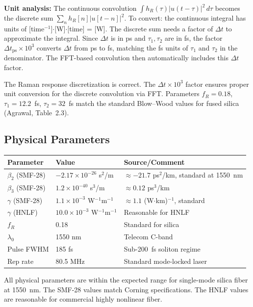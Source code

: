 \documentclass[12pt,a4paper]{article}
\theoremstyle{definition}
\begin{document}
\textbf{Unit analysis:} The continuous convolution $\int h_R(\tau)|u(t-\tau)|^2\,d\tau$ becomes the discrete sum $\sum_n h_R[n]|u[t-n]|^2$. To convert: the continuous integral has units of [time$^{-1}$]$\cdot$[W]$\cdot$[time] = [W]. The discrete sum needs a factor of $\Delta t$ to approximate the integral. Since $\Delta t$ is in ps and $\tau_1, \tau_2$ are in fs, the factor $\Delta t_{\text{ps}} \times 10^3$ converts $\Delta t$ from ps to fs, matching the fs units of $\tau_1$ and $\tau_2$ in the denominator. The FFT-based convolution then automatically includes this $\Delta t$ factor.

\begin{verified}
The Raman response discretization is correct. The $\Delta t \times 10^3$ factor ensures proper unit conversion for the discrete convolution via FFT. Parameters $f_R = 0.18$, $\tau_1 = 12.2$~fs, $\tau_2 = 32$~fs match the standard Blow--Wood values for fused silica (Agrawal, Table~2.3).
\end{verified}

\subsection{Physical Parameters}

\begin{center}
\begin{tabular}{lll}
\toprule
Parameter & Value & Source/Comment \\
\midrule
$\beta_2$ (SMF-28) & $-2.17\times10^{-26}$ s$^2$/m & $\approx -21.7$ ps$^2$/km, standard at 1550~nm \\
$\beta_3$ (SMF-28) & $1.2\times10^{-40}$ s$^3$/m & $\approx 0.12$ ps$^3$/km \\
$\gamma$ (SMF-28) & $1.1\times10^{-3}$ W$^{-1}$m$^{-1}$ & $\approx 1.1$ (W$\cdot$km)$^{-1}$, standard \\
$\gamma$ (HNLF) & $10.0\times10^{-3}$ W$^{-1}$m$^{-1}$ & Reasonable for HNLF \\
$f_R$ & 0.18 & Standard for silica \\
$\lambda_0$ & 1550 nm & Telecom C-band \\
Pulse FWHM & 185 fs & Sub-200~fs soliton regime \\
Rep rate & 80.5 MHz & Standard mode-locked laser \\
\bottomrule
\end{tabular}
\end{center}

\begin{verified}
All physical parameters are within the expected range for single-mode silica fiber at 1550~nm. The SMF-28 values match Corning specifications. The HNLF values are reasonable for commercial highly nonlinear fiber.
\end{verified}
\end{document}
